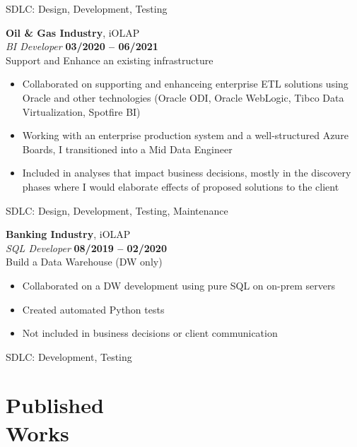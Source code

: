 \documentclass[margin,line]{resume}
\begin{document}
\begin{resume}
\begin{itemize}
    \end{itemize}

    SDLC: Design, Development, Testing

    \textbf{Oil \& Gas Industry}, iOLAP \vspace{2mm}\\\vspace{1mm}%
    \textsl{BI Developer} \hfill \textbf{03/2020 -- 06/2021}\\
    Support and Enhance an existing infrastructure

    \begin{itemize}
        \item Collaborated on supporting and enhanceing enterprise ETL solutions using Oracle and other technologies (Oracle ODI, Oracle WebLogic, Tibco Data Virtualization, Spotfire BI)
		\item Working with an enterprise production system and a well-structured Azure Boards, I transitioned into a Mid Data Engineer
		\item Included in analyses that impact business decisions, mostly in the discovery phases where I would elaborate effects of proposed solutions to the client
		
    \end{itemize}

    SDLC: Design, Development, Testing, Maintenance

    \textbf{Banking Industry}, iOLAP \vspace{2mm}\\\vspace{1mm}%
    \textsl{SQL Developer} \hfill \textbf{08/2019 -- 02/2020}\\
    Build a Data Warehouse (DW only)

    \begin{itemize}
        \item Collaborated on a DW development using pure SQL on on-prem servers
		\item Created automated Python tests
		\item Not included in business decisions or client communication
		
    \end{itemize}

    SDLC: Development, Testing


    \vspace{3mm}
    
    \section{\mysidestyle Published\\Works}


\end{resume}
\end{document}
